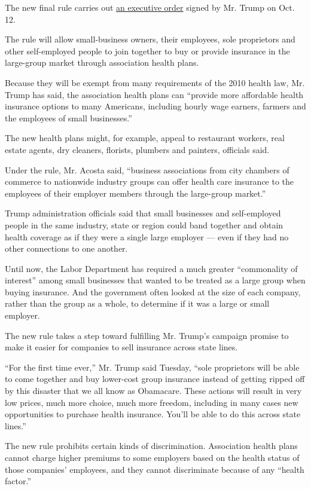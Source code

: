 The new final rule carries out
\href{https://www.nytimes3xbfgragh.onion/2017/10/07/us/politics/trump-association-health-plans.html}{an
executive order} signed by Mr. Trump on Oct. 12.

The rule will allow small-business owners, their employees, sole
proprietors and other self-employed people to join together to buy or
provide insurance in the large-group market through association health
plans.

Because they will be exempt from many requirements of the 2010 health
law, Mr. Trump has said, the association health plans can ``provide more
affordable health insurance options to many Americans, including hourly
wage earners, farmers and the employees of small businesses.''

The new health plans might, for example, appeal to restaurant workers,
real estate agents, dry cleaners, florists, plumbers and painters,
officials said.

Under the rule, Mr. Acosta said, ``business associations from city
chambers of commerce to nationwide industry groups can offer health care
insurance to the employees of their employer members through the
large-group market.''

Trump administration officials said that small businesses and
self-employed people in the same industry, state or region could band
together and obtain health coverage as if they were a single large
employer --- even if they had no other connections to one another.

Until now, the Labor Department has required a much greater
``commonality of interest'' among small businesses that wanted to be
treated as a large group when buying insurance. And the government often
looked at the size of each company, rather than the group as a whole, to
determine if it was a large or small employer.

The new rule takes a step toward fulfilling Mr. Trump's campaign promise
to make it easier for companies to sell insurance across state lines.

``For the first time ever,'' Mr. Trump said Tuesday, ``sole proprietors
will be able to come together and buy lower-cost group insurance instead
of getting ripped off by this disaster that we all know as Obamacare.
These actions will result in very low prices, much more choice, much
more freedom, including in many cases new opportunities to purchase
health insurance. You'll be able to do this across state lines.''

The new rule prohibits certain kinds of discrimination. Association
health plans cannot charge higher premiums to some employers based on
the health status of those companies' employees, and they cannot
discriminate because of any ``health factor.''

